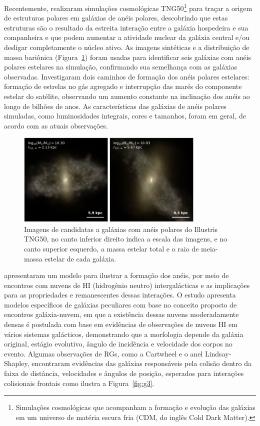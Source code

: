 Recentemente,  realizaram simulações cosmológicas TNG50\footnote{Simulações cosmológicas que acompanham a formação e evolução das galáxias em um universo de matéria escura fria (CDM, do inglês Cold Dark Matter).} para traçar a origem de estruturas polares em galáxias de anéis polares, descobrindo que estas estruturas são o resultado da estreita interação entre a galáxia hospedeira e sua companheira e que podem aumentar a atividade nuclear da galáxia central e/ou desligar completamente o núcleo ativo. As imagens sintéticas e a distribuição de massa bariônica (Figura~\ref{fig:2024prg}) foram usadas para identificar seis galáxias com anéis polares estelares na simulação, confirmando sua semelhança com as galáxias observadas. Investigaram dois caminhos de formação dos anéis polares estelares: formação de estrelas no gás agregado e interrupção das marés do componente estelar do satélite, observando um aumento constante na inclinação dos anéis ao longo de bilhões de anos. As características das galáxias de anéis polares simuladas, como luminosidades integrais, cores e tamanhos, foram em geral, de acordo com as atuais observações.

\begin{figure}[h]
  \centering 
  \includegraphics[width=0.8\textwidth]{Imagens/2024prg.PNG} 
  \caption[Simulações cosmológicas de galáxias com anéis polares.]{Imagens de candidatas a galáxias com anéis polares do Illustris TNG50, no canto inferior direito indica a escala das imagens, e no canto superior esquerdo, a massa estelar total e o raio de meia-massa estelar de cada galáxia.}
  \label{fig:2024prg} 
\end{figure}

 apresentaram um modelo para ilustrar a formação dos anéis, por meio de encontros com nuvens de HI (hidrogênio neutro) intergalácticas e as implicações para as propriedades e remanescentes dessas interações. O estudo apresenta modelos específicos de galáxias peculiares com base no conceito proposto de encontros galáxia-nuvem, em que a existência dessas nuvens moderadamente densas é postulada com base em evidências de observações de nuvens HI em vários sistemas galácticos, demonstrando que a morfologia depende da galáxia original, estágio evolutivo, ângulo de incidência e velocidade dos corpos no evento. Algumas observações de RGs, como a Cartwheel e o anel Lindsay-Shapley, encontraram evidências das galáxias responsáveis pela colisão dentro da faixa de distância, velocidades e ângulos de posição, esperados para interações colisionais frontais \cite{2009madore} como ilustra a Figura~\ref{fig:g3}.

